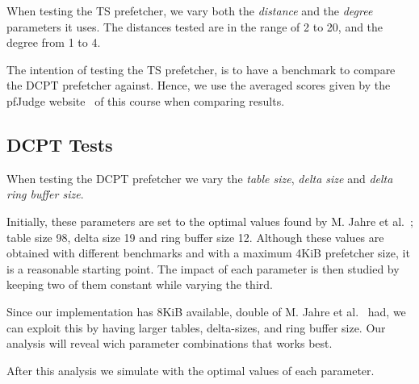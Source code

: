 When testing the TS prefetcher, we vary both the \emph{distance} and the
\emph{degree} parameters it uses. The distances tested are in the range of 2 to
20, and the degree from 1 to 4.

The intention of testing the TS prefetcher, is to have a benchmark to compare
the DCPT prefetcher against. Hence, we use the averaged scores given by the
pfJudge website~\cite[Sec.~2.5]{guidelines} of this course when comparing
results.

\subsection{DCPT Tests}

When testing the DCPT prefetcher we vary the \emph{table size}, \emph{delta
size} and \emph{delta ring buffer size}.

Initially, these parameters are set to the optimal values found by M. Jahre et
al.~\cite{dcpt}; table size 98, delta size 19 and ring buffer size 12. Although
these values are obtained with different benchmarks and with a maximum 4KiB
prefetcher size, it is a reasonable starting point. The impact of each parameter
is then studied by keeping two of them constant while varying the third.

Since our implementation has 8KiB available, double of M. Jahre et
al.~\cite{dcpt} had, we can exploit this by having larger tables, delta-sizes,
and ring buffer size. Our analysis will reveal wich parameter combinations that
works best.

After this analysis we simulate with the optimal values of each parameter.


